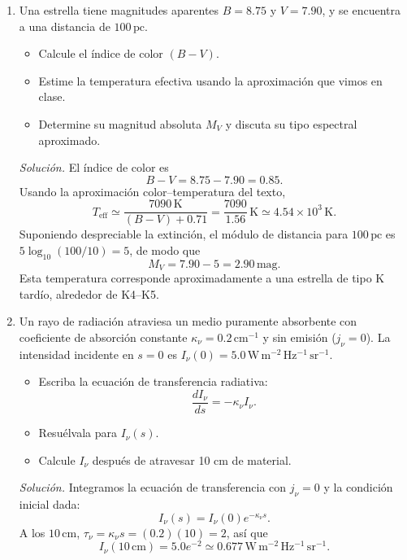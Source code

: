 \documentclass[11pt]{article}
\begin{document}
\begin{enumerate}
    \item Una estrella tiene magnitudes aparentes $B = 8.75$ y $V = 7.90$, y se encuentra a una distancia de $100\,\mathrm{pc}$.
    \begin{itemize}
        \item Calcule el índice de color $(B - V)$.
        \item Estime la temperatura efectiva usando la aproximación que vimos en clase.
        \item Determine su magnitud absoluta $M_V$ y discuta su tipo espectral aproximado.
    \end{itemize}
    \textit{Solución.} El índice de color es
    \[
        B-V=8.75-7.90=0.85.
    \]
    Usando la aproximación color--temperatura del texto,
    \[
        T_{\mathrm{eff}}\simeq\frac{7090\,\mathrm{K}}{(B-V)+0.71}
        =\frac{7090}{1.56}\,\mathrm{K}\simeq4.54\times10^3\,\mathrm{K}.
    \]
    Suponiendo despreciable la extinción, el módulo de distancia para $100\,\mathrm{pc}$ es $5\log_{10}(100/10)=5$, de modo que
    \[
        M_V=7.90-5=2.90\,\mathrm{mag}.
    \]
    Esta temperatura corresponde aproximadamente a una estrella de tipo K tardío, alrededor de K4--K5. \parencite[Sec. 7.3.3, pp. 241--248; Sec. 11.1.2, pp. 337--340; Secs. 11.2 y 11.5.1, pp. 340--350, 360--361]{chaparro2026}

    \item Un rayo de radiación atraviesa un medio puramente absorbente con coeficiente de absorción constante $\kappa_\nu = 0.2\,\mathrm{cm}^{-1}$ y sin emisión ($j_\nu = 0$). La intensidad incidente en $s = 0$ es $I_\nu(0) = 5.0\,\mathrm{W\,m^{-2}\,Hz^{-1}\,sr^{-1}}$.
    \begin{itemize}
        \item Escriba la ecuación de transferencia radiativa:
        \[
            \frac{dI_\nu}{ds} = -\kappa_\nu I_\nu.
        \]
        \item Resuélvala para $I_\nu(s)$.
        \item Calcule $I_\nu$ después de atravesar 10 cm de material.
    \end{itemize}
    \textit{Solución.} Integramos la ecuación de transferencia con $j_\nu=0$ y la condición inicial dada:
    \[
        I_\nu(s)=I_\nu(0)e^{-\kappa_\nu s}.
    \]
    A los $10\,\mathrm{cm}$, $\tau_\nu=\kappa_\nu s=(0.2)(10)=2$, así que
    \[
        I_\nu(10\,\mathrm{cm})=5.0e^{-2}\simeq0.677\,\mathrm{W\,m^{-2}\,Hz^{-1}\,sr^{-1}}.
    \]
    \parencite[Secs. 13.3 y 13.7, pp. 391--405]{chaparro2026}


\end{enumerate}
\end{document}
